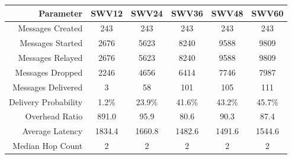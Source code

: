 \documentclass{article}
\begin{document}
\begin{center}
\begin{tabular}{|r|c|c|c|c|c|}
\hline
\textbf{Parameter} & \textbf{SWV12} & \textbf{SWV24} & \textbf{SWV36} & \textbf{SWV48} & \textbf{SWV60} \\ \hline
Messages Created & 243 & 243 & 243 & 243 & 243 \\ \hline
Messages Started & 2676 & 5623 & 8240 & 9588 & 9809 \\ \hline
Messages Relayed & 2676 & 5623 & 8240 & 9588 & 9809 \\ \hline
Messages Dropped & 2246 & 4656 & 6414 & 7746 & 7987 \\ \hline
Messages Delivered & 3 & 58 & 101 & 105 & 111 \\ \hline
Delivery Probability & 1.2\% & 23.9\% & 41.6\% & 43.2\% & 45.7\% \\ \hline
Overhead Ratio & 891.0 & 95.9 & 80.6 & 90.3 & 87.4 \\ \hline
Average Latency & 1834.4 & 1660.8 & 1482.6 & 1491.6 & 1544.6 \\ \hline
Median Hop Count & 2 & 2 & 2 & 2 & 2 \\ \hline
\end{tabular}
\end{center}

\end{document}
